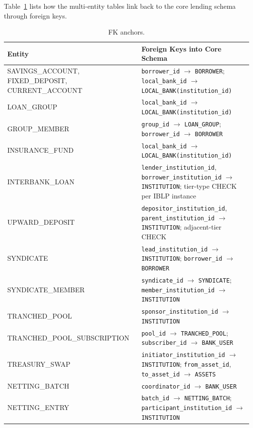 \documentclass[12pt,a4paper]{report}
\newcommand{\tableheadcolor}{\rowcolor{TableHeadBg}}
\begin{document}
Table~\ref{tab:ext-entity-fks} lists how the multi-entity tables link back to the core lending schema through foreign keys.

\begin{table}[H]
\centering
\caption[FK anchors]{FK anchors.}
\label{tab:ext-entity-fks}
\small
\begin{tabular}{@{}p{3.5cm}p{8.5cm}@{}}
\toprule
\tableheadcolor
\textbf{Entity} & \textbf{Foreign Keys into Core Schema} \\
\midrule
SAVINGS\_ACCOUNT, FIXED\_DEPOSIT, CURRENT\_ACCOUNT & \texttt{borrower\_id} $\to$ \texttt{BORROWER}; \texttt{local\_bank\_id} $\to$ \texttt{LOCAL\_BANK(institution\_id)} \\
LOAN\_GROUP & \texttt{local\_bank\_id} $\to$ \texttt{LOCAL\_BANK(institution\_id)} \\
GROUP\_MEMBER & \texttt{group\_id} $\to$ \texttt{LOAN\_GROUP}; \texttt{borrower\_id} $\to$ \texttt{BORROWER} \\
INSURANCE\_FUND & \texttt{local\_bank\_id} $\to$ \texttt{LOCAL\_BANK(institution\_id)} \\
INTERBANK\_LOAN & \texttt{lender\_institution\_id}, \texttt{borrower\_institution\_id} $\to$ \texttt{INSTITUTION}; tier-type CHECK per IBLP instance \\
UPWARD\_DEPOSIT & \texttt{depositor\_institution\_id}, \texttt{parent\_institution\_id} $\to$ \texttt{INSTITUTION}; adjacent-tier CHECK \\
SYNDICATE & \texttt{lead\_institution\_id} $\to$ \texttt{INSTITUTION}; \texttt{borrower\_id} $\to$ \texttt{BORROWER} \\
SYNDICATE\_MEMBER & \texttt{syndicate\_id} $\to$ \texttt{SYNDICATE}; \texttt{member\_institution\_id} $\to$ \texttt{INSTITUTION} \\
TRANCHED\_POOL & \texttt{sponsor\_institution\_id} $\to$ \texttt{INSTITUTION} \\
TRANCHED\_POOL\_SUBSCRIPTION & \texttt{pool\_id} $\to$ \texttt{TRANCHED\_POOL}; \texttt{subscriber\_id} $\to$ \texttt{BANK\_USER} \\
TREASURY\_SWAP & \texttt{initiator\_institution\_id} $\to$ \texttt{INSTITUTION}; \texttt{from\_asset\_id}, \texttt{to\_asset\_id} $\to$ \texttt{ASSETS} \\
NETTING\_BATCH & \texttt{coordinator\_id} $\to$ \texttt{BANK\_USER} \\
NETTING\_ENTRY & \texttt{batch\_id} $\to$ \texttt{NETTING\_BATCH}; \texttt{participant\_institution\_id} $\to$ \texttt{INSTITUTION} \\

\end{tabular}
\end{table}
\end{document}
